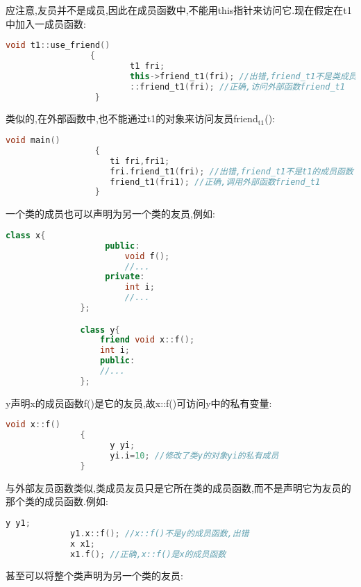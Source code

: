 \documentclass{article}
\begin{document}
应注意,友员并不是成员,因此在成员函数中,不能用this指针来访问它.现在假定在t1中加入一成员函数:
\begin{lstlisting}[language=c++]
                 void t1::use_friend()
                 {
                         t1 fri;
                         this->friend_t1(fri); //出错,friend_t1不是类成员
                         ::friend_t1(fri); //正确,访问外部函数friend_t1
                  }
\end{lstlisting}
类似的,在外部函数中,也不能通过t1的对象来访问友员friend$_{\text{t1}}$():
\begin{lstlisting}[language=c++]
                  void main()
                  {
                     ti fri,fri1;
                     fri.friend_t1(fri); //出错,friend_t1不是t1的成员函数
                     friend_t1(fri1); //正确,调用外部函数friend_t1
                  }
\end{lstlisting}
一个类的成员也可以声明为另一个类的友员,例如:
\begin{lstlisting}[language=c++]
              class x{
                    public:
                        void f();
                        //...
                    private:
                        int i;
                        //...
               };

               class y{
                   friend void x::f();
                   int i;
                   public:
                   //...
               };
\end{lstlisting}
y声明x的成员函数f()是它的友员,故x::f()可访问y中的私有变量:
\begin{lstlisting}[language=c++]
               void x::f()
               {
                     y yi;
                     yi.i=10; //修改了类y的对象yi的私有成员
               }
\end{lstlisting}
与外部友员函数类似,类成员友员只是它所在类的成员函数,而不是声明它为友员的那个类的成员函数.例如:
\begin{lstlisting}[language=c++]
             y y1;
             y1.x::f(); //x::f()不是y的成员函数,出错
             x x1;
             x1.f(); //正确,x::f()是x的成员函数
\end{lstlisting}
甚至可以将整个类声明为另一个类的友员:
\end{document}
